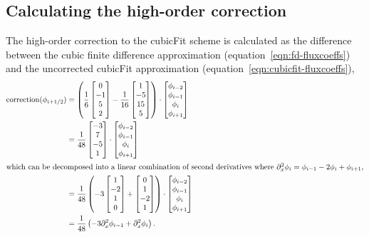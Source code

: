 \documentclass{article}
\begin{document}
\subsection*{Calculating the high-order correction}
The high-order correction to the cubicFit scheme is calculated as the difference between the cubic finite difference approximation (equation~\ref{eqn:fd-fluxcoeffs}) and the uncorrected cubicFit approximation (equation~\ref{eqn:cubicfit-fluxcoeffs}),
\begin{align}
	\mathrm{correction}(\phi_{i+1/2})
	&=
	\left(
	\frac{1}{6} 
	\begin{bmatrix}
		0 \\ -1 \\ 5 \\ 2
	\end{bmatrix}
	-
	\frac{1}{16}
	\begin{bmatrix}
		1 \\ -5 \\ 15 \\ 5
	\end{bmatrix}
	\right)
	\cdot
	\begin{bmatrix}
		\phi_{i-2} \\
		\phi_{i-1} \\
		\phi_i \\
		\phi_{i+1}
	\end{bmatrix} \\
	&=
	\frac{1}{48}
	\begin{bmatrix}
		-3 \\ 7 \\ -5 \\ 1
	\end{bmatrix}
	\cdot
	\begin{bmatrix}
		\phi_{i-2} \\
		\phi_{i-1} \\
		\phi_i \\
		\phi_{i+1}
	\end{bmatrix} \label{eqn:correction} \\
%
\intertext{which can be decomposed into a linear combination of second derivatives where $\partial_x^2 \phi_i = \phi_{i-1} - 2 \phi_i + \phi_{i+1}$,}
%
	&=
	\frac{1}{48} \left(
	-3 \begin{bmatrix}1 \\ -2 \\ 1 \\ 0\end{bmatrix}
	+ \begin{bmatrix}0 \\ 1 \\ -2 \\ 1\end{bmatrix}
	\right)
	\cdot
	\begin{bmatrix}
		\phi_{i-2} \\
		\phi_{i-1} \\
		\phi_i \\
		\phi_{i+1}
	\end{bmatrix} \\
	&=
	\frac{1}{48}
	\left( -3 \partial_x^2 \phi_{i-1} + \partial_x^2 \phi_i \right) \text{.}
\end{align}
\end{document}
